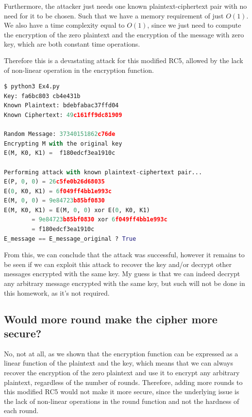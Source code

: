 \documentclass{article}
\begin{document}
Furthermore, the attacker just needs one known plaintext-ciphertext pair with no need for it to be chosen.
Such that we have a memory requirement of just $O(1)$.
We also have a time complexity equal to $O(1)$, since we just need to compute the encryption of the zero plaintext and the encryption of the message with zero key, which are both constant time operations.

Therefore this is a devastating attack for this modified RC5, allowed by the lack of non-linear operation in the encryption function.

\begin{lstlisting}[language=Python]
$ python3 Ex4.py
Key: fa6bc803 cb4e431b
Known Plaintext: bdebfabac37ffd04
Known Ciphertext: 49c161ff9dc81909

Random Message: 37340151862c76de
Encrypting M with the original key
E(M, K0, K1) =  f180edcf3ea1910c

Performing attack with known plaintext-ciphertext pair...
E(P, 0, 0) = 26c5fe0b26d68035
E(0, K0, K1) = 6f049ff4bb1e993c
E(M, 0, 0) = 9e84723b85bf0830
E(M, K0, K1) = E(M, 0, 0) xor E(0, K0, K1)
        = 9e84723b85bf0830 xor 6f049ff4bb1e993c
        = f180edcf3ea1910c
E_message == E_message_original ? True
\end{lstlisting}

From this, we can conclude that the attack was successful, however it remains to be seen if we can exploit this attack to recover the key and/or decrypt other messages encrypted with the same key. My guess is that we can indeed decrypt any arbitrary message encrypted with the same key, but such will not be done in this homework, as it's not required.

\subsection{Would more round make the cipher more secure?}
No, not at all, as we shown that the encryption function can be expressed as a linear function of the plaintext and the key, which means that we can always recover the encryption of the zero plaintext and use it to encrypt any arbitrary plaintext, regardless of the number of rounds.
Therefore, adding more rounds to this modified RC5 would not make it more secure, since the underlying issue is the lack of non-linear operations in the round function and not the hardness of each round.
\end{document}
